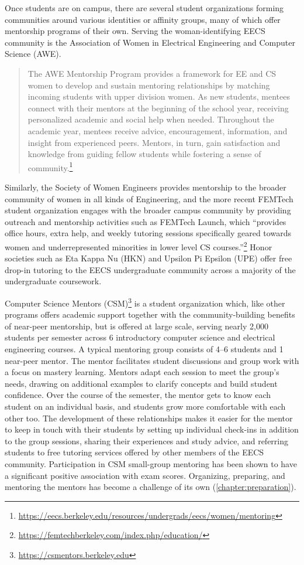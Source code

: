 Once students are on campus, there are several student organizations forming communities around various identities or affinity groups, many of which offer mentorship programs of their own. Serving the woman-identifying EECS community is the Association of Women in Electrical Engineering and Computer Science (AWE).
\begin{quote}
    The AWE Mentorship Program provides a framework for EE and CS women to develop and sustain mentoring relationships by matching incoming students with upper division women. As new students, mentees connect with their mentors at the beginning of the school year, receiving personalized academic and social help when needed. Throughout the academic year, mentees receive advice, encouragement, information, and insight from experienced peers. Mentors, in turn, gain satisfaction and knowledge from guiding fellow students while fostering a sense of community.\footnote{\url{https://eecs.berkeley.edu/resources/undergrads/eecs/women/mentoring}}
\end{quote}
Similarly, the Society of Women Engineers provides mentorship to the broader community of women in all kinds of Engineering, and the more recent FEMTech student organization engages with the broader campus community by providing outreach and mentorship activities such as FEMTech Launch, which ``provides office hours, extra help, and weekly tutoring sessions specifically geared towards women and underrepresented minorities in lower level CS courses.''\footnote{\url{https://femtechberkeley.com/index.php/education/}} Honor societies such as Eta Kappa Nu (HKN) and Upsilon Pi Epsilon (UPE) offer free drop-in tutoring to the EECS undergraduate community across a majority of the undergraduate coursework.

Computer Science Mentors (CSM)\footnote{\url{https://csmentors.berkeley.edu}} is a student organization which, like other programs offers academic support together with the community-building benefits of near-peer mentorship, but is offered at large scale, serving nearly 2,000 students per semester across 6 introductory computer science and electrical engineering courses. A typical mentoring group consists of 4--6 students and 1 near-peer mentor. The mentor facilitates student discussions and group work with a focus on mastery learning. Mentors adapt each session to meet the group's needs, drawing on additional examples to clarify concepts and build student confidence. Over the course of the semester, the mentor gets to know each student on an individual basis, and students grow more comfortable with each other too. The development of these relationships makes it easier for the mentor to keep in touch with their students by setting up individual check-ins in addition to the group sessions, sharing their experiences and study advice, and referring students to free tutoring services offered by other members of the EECS community. Participation in CSM small-group mentoring has been shown to have a significant positive association with exam scores. Organizing, preparing, and mentoring the mentors has become a challenge of its own (\autoref{chapter:preparation}).